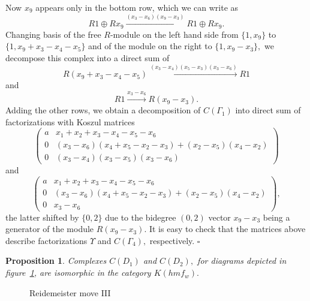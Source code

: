 \documentclass[12pt]{article}
\newtheorem{prop}{Proposition}
\begin{document}
Now $x_9$ appears only in the bottom row, which we can 
write as 
$$R 1 \oplus R x_9 \xrightarrow{ (x_3-x_6)(x_9-x_3)} 
  R 1 \oplus R x_9.$$
Changing basis of the free $R$-module on the left hand side 
from $\{1, x_9\}$ to $\{1, x_9+x_3-x_4-x_5\}$ 
and of the module on the right to $\{ 1, x_9-x_3\},$ we decompose 
this complex into a direct sum of 
$$ R (x_9+x_3-x_4-x_5) \xrightarrow{(x_3-x_4)(x_5-x_3)(x_3-x_6)} 
 R1 $$ 
and 
$$ R 1 \xrightarrow{x_3-x_6} R(x_9-x_3).$$ 
Adding the other rows, we obtain a decomposition of $C(\Gamma_1)$ 
into direct sum of factorizations with Koszul matrices 
$$ \left( \begin{array}{cc} 
    a & x_ 1+ x_2 +x_3 - x_4  - x_5 -x_6 \\ 
    0 & (x_3-x_6)(x_4+x_5-x_2-x_3)+(x_2-x_5)(x_4-x_2)  \\
    0 & (x_3-x_4)(x_3-x_5)(x_3-x_6) \end{array} \right) $$ 
and 
$$\left( \begin{array}{cc} 
    a & x_ 1+ x_2 +x_3 - x_4  - x_5 -x_6 \\ 
    0 & (x_3-x_6)(x_4+x_5-x_2-x_3)+(x_2-x_5)(x_4-x_2)  \\
    0 & x_3-x_6 \end{array} \right), $$
the latter shifted by $\{0,2\}$ due to the bidegree 
$(0,2)$ vector $x_9-x_3$ being a generator of the module $R(x_9-x_3).$ 
It is easy to check that the matrices above describe factorizations 
$\Upsilon$ and $C(\Gamma_4),$ respectively. $\square$ 

\vspace{0.1in} 

\begin{prop} \label{inv-r-three} 
Complexes $C(D_1)$ and $C(D_2),$ for diagrams depicted  
in figure~\ref{rthree0}, are isomorphic in the category $K(hmf_w).$ 
\end{prop}  

\begin{figure}  \caption{Reidemeister move III} 
 \label{rthree0} \end{figure}
\end{document}

